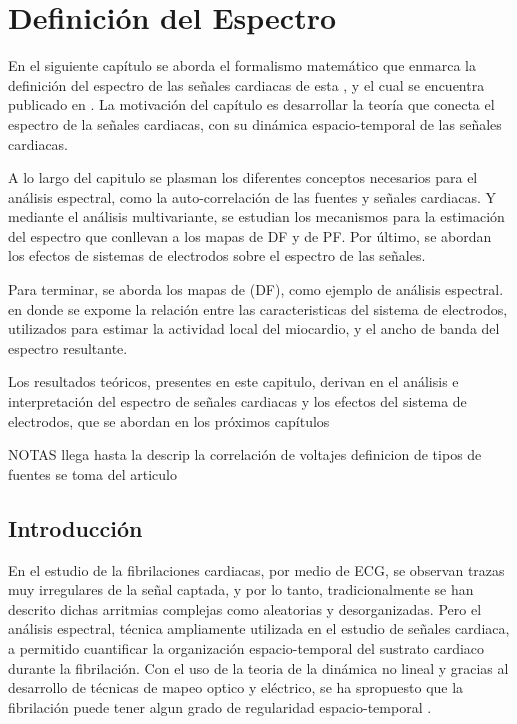\chapter{Definición  del Espectro}



\begin{resumen}

En el siguiente capítulo se aborda el formalismo matemático que enmarca la
definición del espectro de las señales cardiacas de esta \nombreDoc, y el cual
se encuentra publicado en \cite{Requena13b}. La motivación del capítulo es
desarrollar la teoría que conecta el espectro de la señales cardiacas, con su
dinámica espacio-temporal de las señales cardiacas.

A lo largo del capitulo se plasman los diferentes conceptos necesarios para el
análisis espectral, como la auto-correlación de las fuentes y  señales
cardiacas. Y mediante el análisis multivariante, se estudian los mecanismos para
la estimación del espectro que conllevan a los mapas de \acf{DF} y de \acf{PF}.
Por último, se abordan los efectos de sistemas de electrodos sobre el espectro
de las señales.


Para terminar, se aborda los mapas de (\ac{DF}), como ejemplo de análisis
espectral. en donde se expome la relación entre las caracteristicas del sistema
de electrodos, utilizados para estimar la actividad local del miocardio, y el
ancho de banda del espectro resultante.

Los resultados teóricos, presentes en este capitulo, derivan en el análisis e
interpretación del espectro de señales cardiacas y los efectos del sistema
de electrodos, que se abordan en los próximos capítulos





NOTAS llega hasta la descrip la correlación de voltajes  definicion de tipos de
fuentes se toma del articulo

\end{resumen}


\section{Introducción}

En el estudio de la fibrilaciones cardiacas, por medio de \ac{ECG}, se observan
trazas muy irregulares de la señal captada, y por lo tanto, tradicionalmente se
han descrito dichas arritmias complejas como aleatorias  y desorganizadas.
Pero el análisis espectral, técnica ampliamente utilizada en el estudio de
señales cardiaca, a permitido cuantificar la organización espacio-temporal del
sustrato cardiaco durante la fibrilación. Con el uso de la teoria de la dinámica
no lineal y gracias al desarrollo de técnicas de mapeo optico y eléctrico, se ha
spropuesto que la fibrilación puede tener algun grado de regularidad
espacio-temporal \cite{Hoekstra95, Jalife00}.


